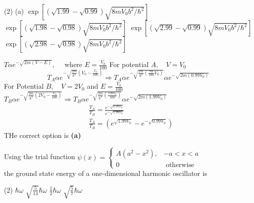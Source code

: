 \begin{enumerate}
\begin{minipage}{\textwidth}
\end{minipage}
\begin{tasks}(2)
	\task[\textbf{A.}](a) $\exp \left[(\sqrt{1.99}-\sqrt{0.99}) \sqrt{8 m V_{0} b^{2} / \hbar^{2}}\right]$
	\task[\textbf{B.}]$\exp \left[(\sqrt{1.98}-\sqrt{0.98}) \sqrt{8 m V_{0} b^{2} / \hbar^{2}}\right]$
	\task[\textbf{C.}] $\exp \left[(\sqrt{2.99}-\sqrt{0.99}) \sqrt{8 m V_{0} b^{2} / \hbar^{2}}\right]$
	\task[\textbf{D.}]$\exp \left[(\sqrt{2.98}-\sqrt{0.98}) \sqrt{8 m V_{0} b^{2} / \hbar^{2}}\right]$
\end{tasks}
\begin{answer}
	$T \alpha e^{-\sqrt{2 m(V-E)}}, \quad$ where $E=\frac{V_{0}}{100}$
	For potential $A, \quad V=V_{0}$
	$$
	T_{A} \alpha e^{-\sqrt{\frac{2 m}{\hbar^{2}}}\left(V_{0}-\frac{V_{0}}{100}\right)} \Rightarrow T_{A} \alpha e^{-\sqrt{\frac{2 m}{\hbar^{2}}\left(\frac{99}{100} V_{0}\right)}} \alpha e^{-\sqrt{2 m\left(0.99 V_{0}\right)}}
	$$
	For Potential $B, \quad V=2 V_{0}$ and $E=\frac{V_{0}}{100}$
	$T_{B} \alpha e^{-\sqrt{\frac{2 m}{\hbar^{2}}\left(2 V_{0}-\frac{V_{0}}{100}\right)}} \Rightarrow T_{B} \alpha e^{-\sqrt{\frac{2 m}{\hbar^{2}}\left(\frac{199 V_{0}}{100}\right)}} \alpha e^{-\sqrt{2 m\left(1.99 V_{0}\right)}}$
	$$
	\begin{aligned}
	&\frac{T_{A}}{T_{B}}=\frac{e^{-\sqrt{0.99 V_{0}}}}{e^{-\sqrt{1.99 V_{0}}}} \\
	&\frac{T_{A}}{T_{B}}=\left(e^{\sqrt{1.99 V_{0}}}-e^{-\sqrt{0.99 V_{0}}}\right)
	\end{aligned}
	$$
	THe correct option is \textbf{(a)}
\end{answer}
\begin{minipage}{\textwidth}
	\item  Using the trial function
	$\psi(x)=\left\{\begin{array}{cc}
	A\left(a^{2}-x^{2}\right), & -a<x<a \\
	0 & \text { otherwise }
	\end{array}\right.$\\
	the ground state energy of a one-dimensional harmonic oscillator is 
\end{minipage}
\begin{tasks}(2)
	\task[\textbf{A.}] $\hbar \omega$
	\task[\textbf{B.}] $\sqrt{\frac{5}{14}} \hbar \omega$
	\task[\textbf{C.}]$\frac{1}{2} \hbar \omega$
	\task[\textbf{D.}] $\sqrt{\frac{5}{7}} \hbar \omega$
\end{tasks}
\begin{answer}

\end{answer}
\end{enumerate}
